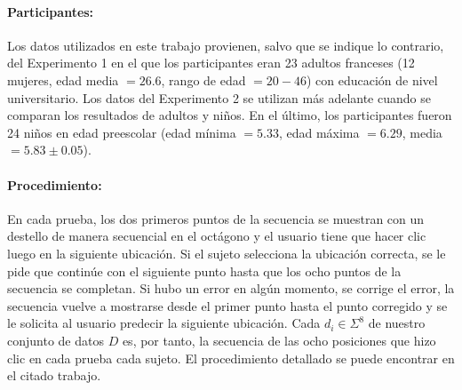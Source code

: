 \paragraph{Participantes:} Los datos utilizados en este trabajo provienen, salvo que se indique lo contrario, del Experimento 1 en el que los participantes eran 23 adultos franceses (12 mujeres, edad media $= 26.6$, rango de edad $= 20 - 46$) con educación de nivel universitario. Los datos del Experimento 2 se utilizan más adelante cuando se comparan los resultados de adultos y niños. En el último, los participantes fueron 24 niños en edad preescolar (edad mínima $= 5.33$, edad máxima $= 6.29$, media $= 5.83 \pm 0.05$).


\paragraph{Procedimiento:} En cada prueba, los dos primeros puntos de la secuencia se muestran con un destello de manera secuencial en el octágono y el usuario tiene que hacer clic luego en la siguiente ubicación. Si el sujeto selecciona la ubicación correcta, se le pide que continúe con el siguiente punto hasta que los ocho puntos de la secuencia se completan. Si hubo un error en algún momento, se corrige el error, la secuencia vuelve a mostrarse desde el primer punto hasta el punto corregido y se le solicita al usuario predecir la siguiente ubicación. Cada $d_i \in \Sigma^8$ de nuestro conjunto de datos $D$ es, por tanto, la secuencia de las ocho posiciones que hizo clic en cada prueba cada sujeto. El procedimiento detallado se puede encontrar en el citado trabajo.

